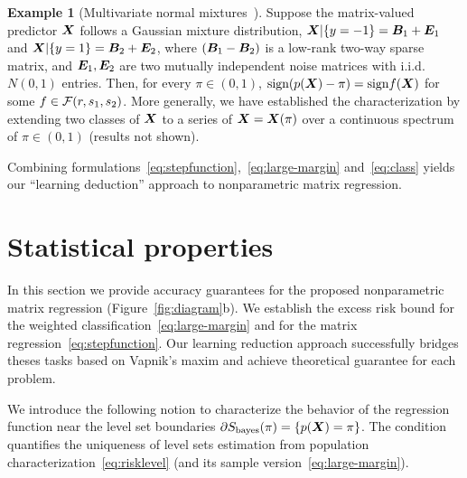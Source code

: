 \documentclass[11pt]{article}
\theoremstyle{definition}
\newtheorem{example}{Example}
\def\sign{\textup{sign}}
\begin{document}
\begin{example}[Multivariate normal mixtures~\citep{hu2020matrix}] Suppose the matrix-valued predictor $\bm X$ follows a Gaussian mixture distribution, $\bm X|\{y=-1\}=\bm B_1+\bm{E}_1$ and $ \bm X|\{y=1\}=\bm B_2+\bm{E}_2$, where $(\bm B_1-\bm B_2)$ is a low-rank two-way sparse matrix, and $\bm{E}_1, \bm{E}_2$ are two mutually independent noise matrices with i.i.d.\ $N(0,1)$ entries. Then, for every $\pi\in(0,1)$, $\sign(p(\mX)-\pi)= \sign f(\mX)$ for some $f\in \mathcal{F}(r,s_1,s_2)$. More generally, we have established the characterization by extending two classes of $\bm X$ to a series of $\bm X=\bm X(\pi)$ over a continuous spectrum of $\pi \in (0,1)$ (results not shown). 

\end{example}

Combining formulations~\eqref{eq:stepfunction},~\eqref{eq:large-margin} and~\eqref{eq:class} yields our ``learning deduction'' approach to nonparametric matrix regression.
 

\section{Statistical properties}\label{sec:theory}
In this section we provide accuracy guarantees for the proposed nonparametric matrix regression (Figure~\ref{fig:diagram}b). We establish the excess risk bound for the weighted classification~\eqref{eq:large-margin} and for the matrix regression~\eqref{eq:stepfunction}. Our learning reduction approach successfully bridges theses tasks based on Vapnik’s maxim and achieve theoretical guarantee for each problem. 

We introduce the following notion to characterize the behavior of the regression function near the level set boundaries $\partial S_{\text{bayes}}(\pi) = \{ p(\bm X)= \pi\}$. The condition quantifies the uniqueness of level sets estimation from population characterization~\eqref{eq:risklevel} (and its sample version~\eqref{eq:large-margin}). 
\end{document}
